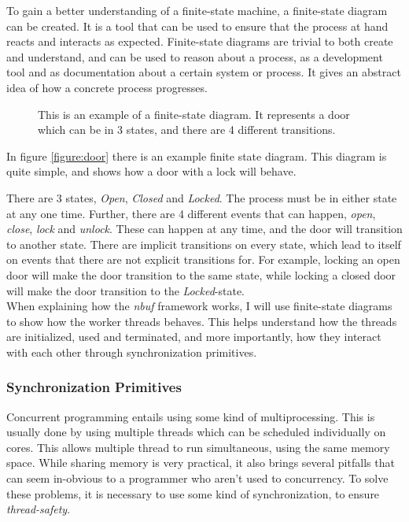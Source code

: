 \documentclass[a4paper]{article}
\newcommand{\nbuf}{\textit{nbuf} }
\begin{document}
To gain a better understanding of a finite-state machine, a finite-state diagram can be created. It is a tool that can be used to ensure that the process at hand reacts and interacts as expected. Finite-state diagrams are trivial to both create and understand, and can be used to reason about a process, as a development tool and as documentation about a certain system or process. It gives an abstract idea of how a concrete process progresses.\\

\begin{figure}
	\begin{adjustwidth}{-0.5in}{-0.5in}
    \centering
    \def\svgwidth{\columnwidth}
    
  	\caption{This is an example of a finite-state diagram. It represents a door which can be in 3 states, and there are 4 different transitions.}
	\label{figure:door}
	\end{adjustwidth}
\end{figure}

In figure \autoref{figure:door} there is an example finite state diagram. This diagram is quite simple, and shows how a door with a lock will behave.

There are 3 states, \textit{Open}, \textit{Closed} and \textit{Locked}. The process must be in either state at any one time. Further, there are 4 different events that can happen, \textit{open}, \textit{close}, \textit{lock} and \textit{unlock}. These can happen at any time, and the door will transition to another state. There are implicit transitions on every state, which lead to itself on events that there are not explicit transitions for. For example, locking an open door will make the door transition to the same state, while locking a closed door will make the door transition to the \textit{Locked}-state.\\

When explaining how the \nbuf framework works, I will use finite-state diagrams to show how the worker threads behaves. This helps understand how the threads are initialized, used and terminated, and more importantly, how they interact with each other through synchronization primitives.


\subsubsection{Synchronization Primitives}
Concurrent programming entails using some kind of multiprocessing. This is usually done by using multiple threads which can be scheduled individually on cores. This allows multiple thread to run simultaneous, using the same memory space. While sharing memory is very practical, it also brings several pitfalls that can seem in-obvious to a programmer who aren't used to concurrency. To solve these problems, it is necessary to use some kind of synchronization, to ensure \textit{thread-safety}.
\end{document}
